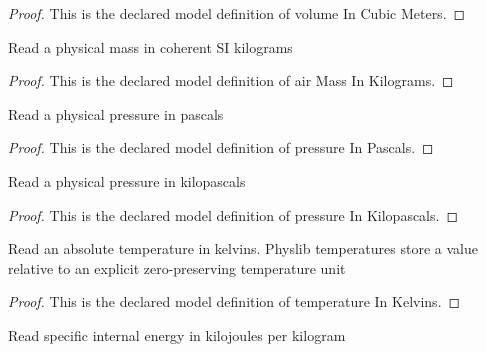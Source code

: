 \begin{proof}
  This is the declared model definition of volume In Cubic Meters.
\end{proof}
\begin{definition}
  \label{def:physics:phyx-mini-0458:phyxminiproblems-problemphyxmini0458-airmassinkilograms}
  Read a physical mass in coherent SI kilograms
\end{definition}
\begin{proof}
  This is the declared model definition of air Mass In Kilograms.
\end{proof}
\begin{definition}
  \label{def:physics:phyx-mini-0458:phyxminiproblems-problemphyxmini0458-pressureinpascals}
  Read a physical pressure in pascals
\end{definition}
\begin{proof}
  This is the declared model definition of pressure In Pascals.
\end{proof}
\begin{definition}
  \label{def:physics:phyx-mini-0458:phyxminiproblems-problemphyxmini0458-pressureinkilopascals}
  Read a physical pressure in kilopascals
\end{definition}
\begin{proof}
  This is the declared model definition of pressure In Kilopascals.
\end{proof}
\begin{definition}
  \label{def:physics:phyx-mini-0458:phyxminiproblems-problemphyxmini0458-temperatureinkelvins}
  Read an absolute temperature in kelvins. Physlib temperatures store a value relative to an explicit zero-preserving temperature unit
\end{definition}
\begin{proof}
  This is the declared model definition of temperature In Kelvins.
\end{proof}
\begin{definition}
  \label{def:physics:phyx-mini-0458:phyxminiproblems-problemphyxmini0458-specificinternalenergyinkilojoulesperkilogram}
  Read specific internal energy in kilojoules per kilogram
\end{definition}
